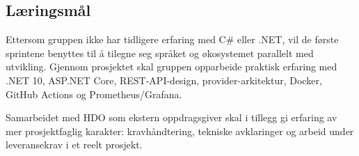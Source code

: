 \subsection{Læringsmål}

Ettersom gruppen ikke har tidligere erfaring med C\# eller .NET, vil de første sprintene benyttes til å tilegne seg språket og økosystemet parallelt med utvikling. Gjennom prosjektet skal gruppen opparbeide praktisk erfaring med .NET 10, ASP.NET Core, REST-API-design, provider-arkitektur, Docker, GitHub Actions og Prometheus/Grafana.

Samarbeidet med HDO som ekstern oppdragsgiver skal i tillegg gi erfaring av mer prosjektfaglig karakter: kravhåndtering, tekniske avklaringer og arbeid under leveransekrav i et reelt prosjekt.


